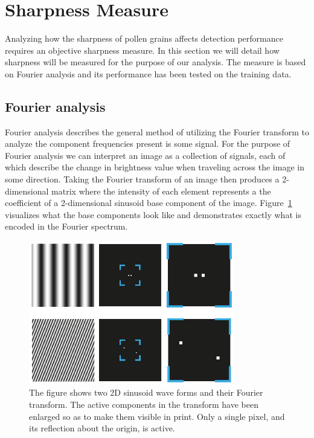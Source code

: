 
\section{Sharpness Measure}\label{sec:method-sharpness}
Analyzing how the sharpness of pollen grains affects detection performance requires an objective sharpness measure.
In this section we will detail how sharpness will be measured for the purpose of our analysis.
The measure is based on Fourier analysis and its performance has been tested on the training data.

\subsection{Fourier analysis}
Fourier analysis describes the general method of utilizing the Fourier transform to analyze the component frequencies present is some signal.
For the purpose of Fourier analysis we can interpret an image as a collection of signals, each of which describe the change in brightness value when traveling across the image in some direction.
Taking the Fourier transform of an image then produces a 2-dimensional matrix where the intensity of each element represents a the coefficient of a 2-dimensional sinusoid base component of the image.
Figure~\ref{fig:fourier-sinusoid} visualizes what the base components look like and demonstrates exactly what is encoded in the Fourier spectrum.

\begin{figure}[htbp]
  \centering
  \includegraphics[width=0.8\textwidth]{figs/fourier/fourier-sinusoid.pdf}
  \caption[Fourier transform of sinusoid]{The figure shows two 2D sinusoid wave forms and their Fourier transform. The active components in the transform have been enlarged so as to make them visible in print. Only a single pixel, and its reflection about the origin, is active.}\label{fig:fourier-sinusoid}
\end{figure}

